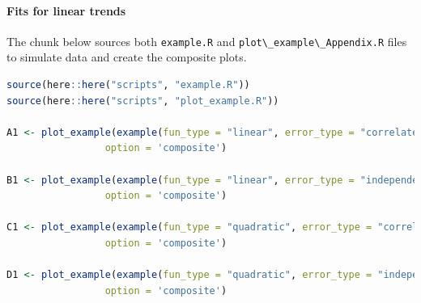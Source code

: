 \documentclass[
]{article}
\newcommand{\passthrough}[1]{#1}
\begin{document}
\hypertarget{fits-for-linear-trends}{%
\paragraph{Fits for linear trends}\label{fits-for-linear-trends}}

The chunk below sources both \passthrough{\lstinline!example.R!} and \passthrough{\lstinline!plot\_example\_Appendix.R!} files to simulate data and create the composite plots.

\begin{lstlisting}[language=R]
source(here::here("scripts", "example.R"))
source(here::here("scripts", "plot_example.R"))

A1 <- plot_example(example(fun_type = "linear", error_type = "correlated"),
                 option = 'composite') 

B1 <- plot_example(example(fun_type = "linear", error_type = "independent"),
                 option = 'composite') 

C1 <- plot_example(example(fun_type = "quadratic", error_type = "correlated"), 
                 option = 'composite') 

D1 <- plot_example(example(fun_type = "quadratic", error_type = "independent"), 
                 option = 'composite') 
\end{lstlisting}
\end{document}

